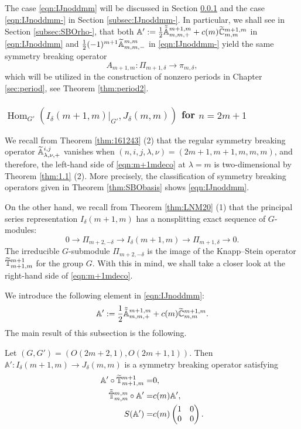 The case \eqref{eqn:IJnoddmm} will be discussed
 in Section \ref{subsec:IJnoddmm}
 and the case \eqref{eqn:IJnoddmm-}
 in Section \ref{subsec:IJnoddmm-}.  
In particular,
 we shall see in Section \ref{subsec:SBOrho-}, 
 that both 
 ${\mathbb{A}}':= \frac 1 2 \tilde{\tilde{{\mathbb{A}}}}_{{m},{m},{+}}^{{m+1,m}}+
 c(m) \widetilde{{\mathbb{C}}}_{{m},{m}}^{{m+1,m}}$
 in \eqref{eqn:IJnoddmm}
 and $\frac 1 2 (-1)^{m+1}{\widetilde{\mathbb{A}}}_{{m},{m},{-}}^{{m,m}}$
 in \eqref{eqn:IJnoddmm-}
 yield the same symmetry breaking operator
\[
  A_{m+1,m} \colon \Pi_{m+1,\delta} \to \pi_{m,\delta}, 
\]
 which will be utilized in the construction 
 of nonzero periods in Chapter \ref{sec:period}, 
 see Theorem \ref{thm:period2}.  

\subsubsection
{${\operatorname{Hom}}_{G'}(I_{\delta}(m+1,m)|_{G'}, J_{\delta}(m,m))$
 for $n=2m+1$}
\label{subsec:IJnoddmm}
We recall from Theorem \ref{thm:161243} (2)
 that the regular symmetry breaking operator
 ${\widetilde{\mathbb{A}}}_{{\lambda},{\nu},{+}}^{{i,j}}$ vanishes
 when $(n,i,j, \lambda, \nu)=(2m+1,m+1,m,m,m)$, 
and therefore, 
 the left-hand side of \eqref{eqn:m+1mdeco} 
 at $\lambda=m$ is two-dimensional 
 by Theorem \ref{thm:1.1} (2).  
More precisely, 
 the classification
 of symmetry breaking operators
 given in Theorem \ref{thm:SBObasis} shows \eqref{eqn:IJnoddmm}.  



On the other hand, 
 we recall from Theorem \ref{thm:LNM20} (1)
 that the principal series representation $I_{\delta}(m+1,m)$ has
 a nonsplitting exact sequence of $G$-modules:
\[
 0 \to \Pi_{m+2,-\delta} \to I_{\delta}(m+1,m) \to \Pi_{m+1,\delta} \to 0.  
\]
The irreducible $G$-submodule $\Pi_{m+2,-\delta}$ is the image
 of the Knapp--Stein operator $\widetilde{{\mathbb{T}}}_{{m+1},{m}}^{{m+1}}$ for the group $G$.  
With this in mind,
 we shall take a closer look at the right-hand side of 
 \eqref{eqn:m+1mdeco}.  



We introduce the following element in \eqref{eqn:IJnoddmm}:
\begin{equation}
\label{eqn:Aprimm}
  {\mathbb{A}}'
:=
  \frac 1 2 \tilde{\tilde{{\mathbb{A}}}}_{{m},{m},{+}}^{{m+1,m}}
  +
  c(m) \widetilde{{\mathbb{C}}}_{{m},{m}}^{{m+1,m}}.  
\end{equation}
The main result of this subsection is the following.  


\begin{proposition}
\label{prop:1802103}
Let $(G,G')=(O(2m+2,1),O(2m+1,1))$.  
Then ${\mathbb{A}}' \colon I_{\delta}(m+1,m) \to J_{\delta}(m,m)$ is 
 a symmetry breaking operator satisfying 
\begin{align*}
 {\mathbb{A}}'  \circ \widetilde{{\mathbb{T}}}_{{m+1},{m}}^{{m+1}} =&0, 
\\
 \tilde{\tilde{{\mathbb{T}}}}_{{m},{m}}^{{m,m}} \circ {\mathbb{A}}' 
  =& c(m) {\mathbb{A}}',  
\\
 S({\mathbb{A}}' 
  )=& c(m) \begin{pmatrix} 1 & 0 \\ 0 & 0 \end{pmatrix}.  
\end{align*}
\end{proposition}



